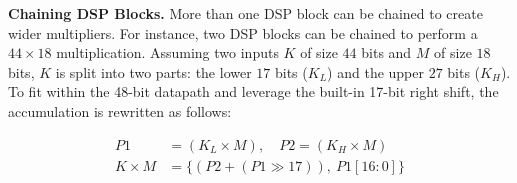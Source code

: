 \documentclass[sigconf,9pt,review]{acmart}
\begin{document}





\noindent\textbf{Chaining DSP Blocks.} \label{sec_dsp_cascade}
More than one DSP block can be chained to create wider multipliers.
For instance, two DSP blocks can be chained to perform a $44\times18$ multiplication.
Assuming two inputs $K$ of size $44$ bits and $M$ of size $18$ bits,
$K$ is split into two parts: the lower $17$ bits ($K_L$) and the upper $27$ bits ($K_H$).
To fit within the 48-bit datapath and leverage the built-in 17-bit right shift, the accumulation is rewritten as follows:

\begin{equation} \label{dsp_cascade_shift_eq}
\begin{split}
    P1 &= (K_L\times M), \quad P2 = (K_H \times M)\\
    K\times M &=  \{(P2 + (P1 \gg 17)),
            \ P1[16:0]\}
\end{split}
\end{equation}
\end{document}

